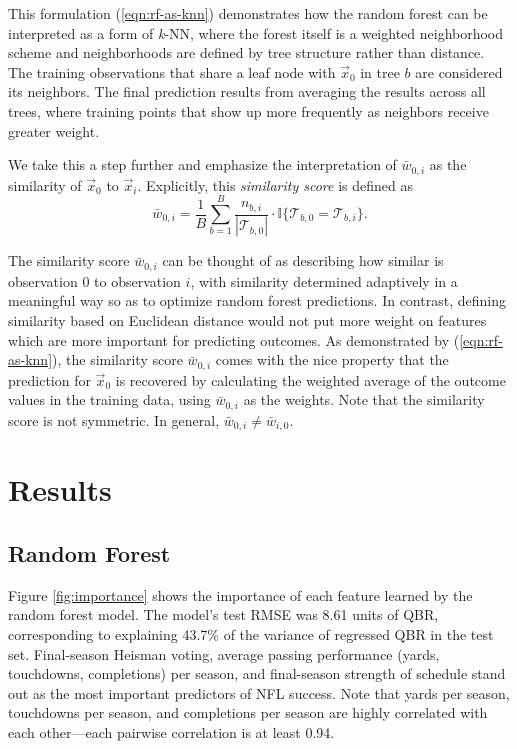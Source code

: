 \documentclass{article}
\begin{document}
This formulation (\ref{eqn:rf-as-knn}) demonstrates how the random forest can be interpreted as a form of \textit{k}-NN, where the forest itself is a weighted neighborhood scheme and neighborhoods are defined by tree structure rather than distance. The training observations that share a leaf node with $\vec x_0$ in tree $b$ are considered its neighbors. The final prediction results from averaging the results across all trees, where training points that show up more frequently as neighbors receive greater weight.

We take this a step further and emphasize the interpretation of $\bar w_{0,i}$ as the similarity of $\vec x_0$ to $\vec x_i$. Explicitly, this {\it similarity score} is defined as
\begin{equation}
  \label{eqn:similarity}
  \bar w_{0,i} = \frac{1}{B}\sum_{b = 1}^B
    \frac{n_{b,i}}{|\mathcal{T}_{b,0}|} \cdot \mathbb{I}\{\mathcal{T}_{b,0} = \mathcal{T}_{b,i}\}.
\end{equation}

The similarity score $\bar w_{0,i}$ can be thought of as describing how similar is observation 0 to observation $i$, with similarity determined adaptively in a meaningful way so as to optimize random forest predictions. In contrast, defining similarity based on Euclidean distance would not put more weight on features which are more important for predicting outcomes. As demonstrated by (\ref{eqn:rf-as-knn}), the similarity score $\bar w_{0,i}$ comes with the nice property that the prediction for $\vec x_0$ is recovered by calculating the weighted average of the outcome values in the training data, using $\bar w_{0,i}$ as the weights. Note that the similarity score is not symmetric. In general, $\bar w_{0,i} \ne \bar w_{i,0}$.

\section{Results}
\label{sec:results}

\subsection{Random Forest}

Figure \ref{fig:importance} shows the importance of each feature learned by the random forest model. The model's test RMSE was 8.61 units of QBR, corresponding to explaining 43.7\% of the variance of regressed QBR in the test set. Final-season Heisman voting, average passing performance (yards, touchdowns, completions) per season, and final-season strength of schedule stand out as the most important predictors of NFL success. Note that yards per season, touchdowns per season, and completions per season are highly correlated with each other---each pairwise correlation is at least 0.94.
\end{document}
